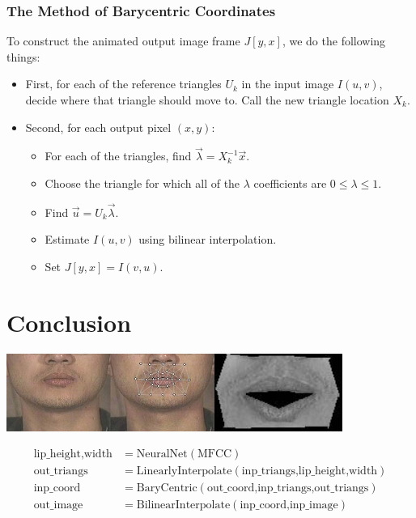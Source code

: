 \documentclass{beamer}
\begin{document}
\begin{frame}
  \frametitle{The Method of Barycentric Coordinates}
  To construct the animated output image frame $J[y,x]$, we do
  the following things:
  \begin{itemize}
  \item First, for each of the reference triangles $U_k$ in the input
    image $I(u,v)$, decide where that triangle
    should move to.  Call the new triangle location $X_k$.
  \item Second, for each output pixel $(x,y)$:
    \begin{itemize}
    \item For each of the triangles, find $\vec\lambda=X_k^{-1}\vec{x}$.
    \item Choose the triangle for which all of the $\lambda$ coefficients
      are $0\le\lambda\le 1$.
    \item Find $\vec{u}=U_k\vec\lambda$.
    \item Estimate $I(u,v)$ using bilinear interpolation.
    \item Set $J[y,x]=I(v,u)$.
    \end{itemize}
  \end{itemize}
\end{frame}

\section{Conclusion}
\setcounter{subsection}{1}

\begin{frame}
  \centerline{\includegraphics[height=1in]{mp7_image_warping_points.jpg}\includegraphics[height=1in]{mp7_image_warped.jpg}}
  \begin{align*}
    \mbox{lip\_height,width} &= \mbox{NeuralNet}\left(\mbox{MFCC}\right)\\
    \mbox{out\_triangs} &= \mbox{LinearlyInterpolate}\left(\mbox{inp\_triangs,lip\_height,width}\right)\\
    \mbox{inp\_coord} &= \mbox{BaryCentric}\left(\mbox{out\_coord,inp\_triangs,out\_triangs}\right)\\
    \mbox{out\_image} &= \mbox{BilinearInterpolate}\left(\mbox{inp\_coord,inp\_image}\right)
  \end{align*}
\end{frame}
\end{document}
